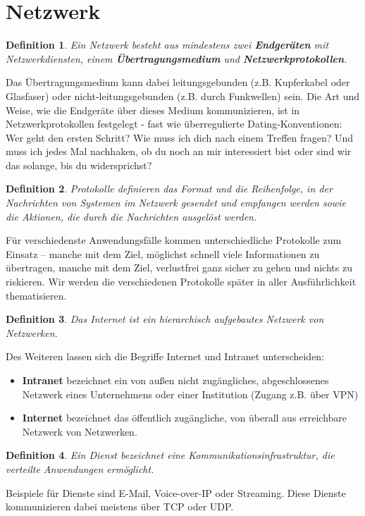 \documentclass[11pt,a4paper]{scrartcl}
\newtheorem{definition}{Definition}
\begin{document}
\section{Netzwerk}
\begin{definition}
Ein Netzwerk besteht aus mindestens zwei \textbf{Endgeräten} mit Netzwerkdiensten, einem \textbf{Übertragungsmedium} und \textbf{Netzwerkprotokollen}.
\end{definition}
Das Übertragungsmedium kann dabei leitungsgebunden (z.B. Kupferkabel oder Glasfaser) oder nicht-leitungsgebunden (z.B. durch Funkwellen) sein. Die Art und Weise, wie die Endgeräte über dieses Medium kommunizieren, ist in Netzwerkprotokollen festgelegt - fast wie überregulierte Dating-Konventionen: Wer geht den ersten Schritt? Wie muss ich dich nach einem Treffen fragen? Und muss ich jedes Mal nachhaken, ob du noch an mir interessiert bist oder sind wir das solange, bis du widersprichst? 
\begin{definition}
Protokolle definieren das Format und die Reihenfolge, in der Nachrichten von Systemen im Netzwerk gesendet und empfangen werden sowie die Aktionen, die durch die Nachrichten ausgelöst werden.
\end{definition}
Für verschiedenste Anwendungsfälle kommen unterschiedliche Protokolle zum Einsatz -- manche mit dem Ziel, möglichst schnell viele Informationen zu übertragen, manche mit dem Ziel, verlustfrei ganz sicher zu gehen und nichts zu riskieren. Wir werden die verschiedenen Protokolle später in aller Ausführlichkeit thematisieren.
\begin{definition}
Das Internet ist ein hierarchisch aufgebautes Netzwerk von Netzwerken.
\end{definition}
Des Weiteren lassen sich die Begriffe Internet und Intranet unterscheiden:
\begin{itemize}
\item \textbf{Intranet} bezeichnet ein von außen nicht zugängliches, abgeschlossenes Netzwerk eines Unternehmens oder einer Institution (Zugang z.B. über VPN)
\item \textbf{Internet} bezeichnet das öffentlich zugängliche, von überall aus erreichbare Netzwerk von Netzwerken.
\end{itemize}
\begin{definition}
Ein Dienst bezeichnet eine Kommunikationsinfrastruktur, die verteilte Anwendungen ermöglicht.
\end{definition}
Beispiele für Dienste sind E-Mail, Voice-over-IP oder Streaming. Diese Dienste kommunizieren dabei meistens über TCP oder UDP.
\end{document}
